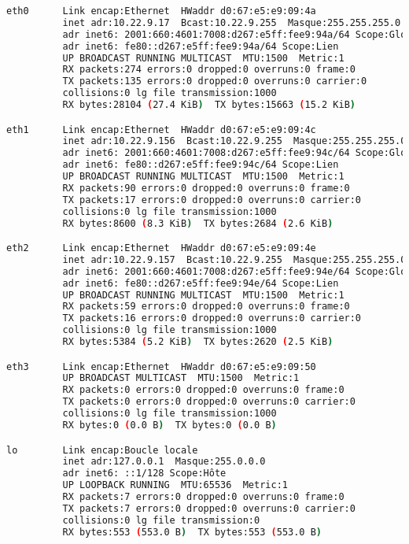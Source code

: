 \documentclass[french]{article}
\begin{document}
\begin{lstlisting}[language=bash,caption={ifconfig}]
eth0      Link encap:Ethernet  HWaddr d0:67:e5:e9:09:4a  
          inet adr:10.22.9.17  Bcast:10.22.9.255  Masque:255.255.255.0
          adr inet6: 2001:660:4601:7008:d267:e5ff:fee9:94a/64 Scope:Global
          adr inet6: fe80::d267:e5ff:fee9:94a/64 Scope:Lien
          UP BROADCAST RUNNING MULTICAST  MTU:1500  Metric:1
          RX packets:274 errors:0 dropped:0 overruns:0 frame:0
          TX packets:135 errors:0 dropped:0 overruns:0 carrier:0
          collisions:0 lg file transmission:1000 
          RX bytes:28104 (27.4 KiB)  TX bytes:15663 (15.2 KiB)

eth1      Link encap:Ethernet  HWaddr d0:67:e5:e9:09:4c  
          inet adr:10.22.9.156  Bcast:10.22.9.255  Masque:255.255.255.0
          adr inet6: 2001:660:4601:7008:d267:e5ff:fee9:94c/64 Scope:Global
          adr inet6: fe80::d267:e5ff:fee9:94c/64 Scope:Lien
          UP BROADCAST RUNNING MULTICAST  MTU:1500  Metric:1
          RX packets:90 errors:0 dropped:0 overruns:0 frame:0
          TX packets:17 errors:0 dropped:0 overruns:0 carrier:0
          collisions:0 lg file transmission:1000 
          RX bytes:8600 (8.3 KiB)  TX bytes:2684 (2.6 KiB)

eth2      Link encap:Ethernet  HWaddr d0:67:e5:e9:09:4e  
          inet adr:10.22.9.157  Bcast:10.22.9.255  Masque:255.255.255.0
          adr inet6: 2001:660:4601:7008:d267:e5ff:fee9:94e/64 Scope:Global
          adr inet6: fe80::d267:e5ff:fee9:94e/64 Scope:Lien
          UP BROADCAST RUNNING MULTICAST  MTU:1500  Metric:1
          RX packets:59 errors:0 dropped:0 overruns:0 frame:0
          TX packets:16 errors:0 dropped:0 overruns:0 carrier:0
          collisions:0 lg file transmission:1000 
          RX bytes:5384 (5.2 KiB)  TX bytes:2620 (2.5 KiB)

eth3      Link encap:Ethernet  HWaddr d0:67:e5:e9:09:50  
          UP BROADCAST MULTICAST  MTU:1500  Metric:1
          RX packets:0 errors:0 dropped:0 overruns:0 frame:0
          TX packets:0 errors:0 dropped:0 overruns:0 carrier:0
          collisions:0 lg file transmission:1000 
          RX bytes:0 (0.0 B)  TX bytes:0 (0.0 B)

lo        Link encap:Boucle locale  
          inet adr:127.0.0.1  Masque:255.0.0.0
          adr inet6: ::1/128 Scope:Hôte
          UP LOOPBACK RUNNING  MTU:65536  Metric:1
          RX packets:7 errors:0 dropped:0 overruns:0 frame:0
          TX packets:7 errors:0 dropped:0 overruns:0 carrier:0
          collisions:0 lg file transmission:0 
          RX bytes:553 (553.0 B)  TX bytes:553 (553.0 B)


\end{lstlisting}
\newpage
\end{document}
